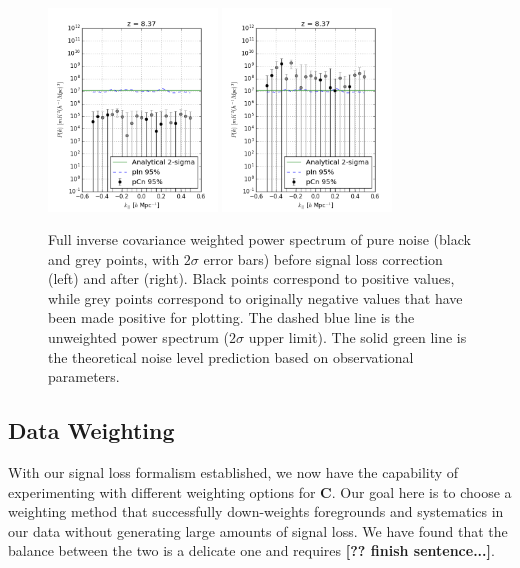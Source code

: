\documentclass[preprint2,numberedappendix,tighten,twocolappendix]{aastex6}  %
\newcommand{\cc}[1]{{\color{purple} \textbf{[#1]}}}
\begin{document}
\begin{figure}
	\centering
	\includegraphics[width=0.4\textwidth]{ps2_noise_nosigloss.png}
	\includegraphics[width=0.4\textwidth]{ps2_noise.png}
	\caption{Full inverse covariance weighted power spectrum of pure noise (black and grey points, with $2\sigma$ error bars) before signal loss correction (left) and after (right). Black points correspond to positive values, while grey points correspond to originally negative values that have been made positive for plotting. The dashed blue line is the unweighted power spectrum ($2\sigma$ upper limit). The solid green line is the theoretical noise level prediction based on observational parameters.}
	\label{fig:ps2_noise}
\end{figure}

\subsection{Data Weighting}
\label{sec:Weight}

With our signal loss formalism established, we now have the capability of experimenting with different weighting options for $\textbf{C}$. Our goal here is to choose a weighting method that successfully down-weights foregrounds and systematics in our data without generating large amounts of signal loss. We have found that the balance between the two is a delicate one and requires \cc{?? finish sentence...}. 
\end{document}
